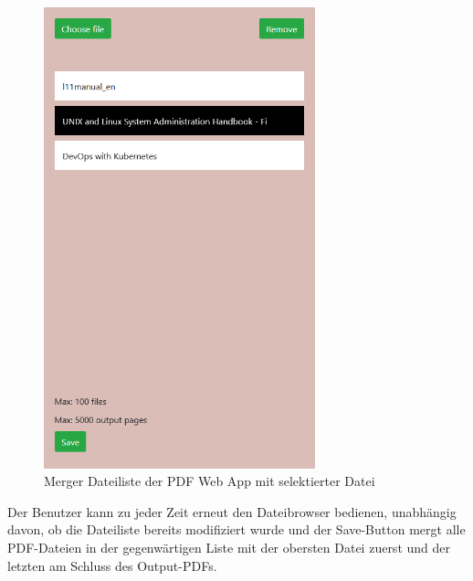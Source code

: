 \begin{figure}[!htbp]
	\centering
	\includegraphics[width=0.7\textwidth]{"images/mergelist.png"}
	\caption{Merger Dateiliste der PDF Web App mit selektierter Datei}
	\label{fig:mergelist}
\end{figure}

Der Benutzer kann zu jeder Zeit erneut den Dateibrowser bedienen, unabhängig davon, ob die Dateiliste bereits modifiziert wurde und der Save-Button mergt alle PDF-Dateien in der gegenwärtigen Liste mit der obersten Datei zuerst und der letzten am Schluss des Output-PDFs.


